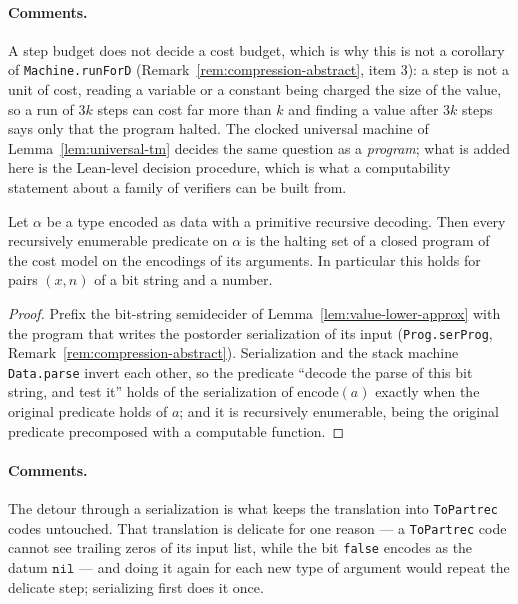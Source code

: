 \paragraph{Comments.} A step budget does not decide a cost budget, which is why this is not
a corollary of \texttt{Machine.runForD} (Remark~\ref{rem:compression-abstract}, item 3): a
step is not a unit of cost, reading a variable or a constant being charged the size of the
value, so a run of $3k$ steps can cost far more than $k$ and finding a value after $3k$
steps says only that the program halted. The clocked universal machine of
Lemma~\ref{lem:universal-tm} decides the same question as a \emph{program}; what is added
here is the Lean-level decision procedure, which is what a computability statement about a
family of verifiers can be built from.

\effortEasy

\begin{lemma}
\label{lem:semidecide-encoded}
\leanok
Let $\alpha$ be a type encoded as data with a primitive recursive decoding. Then every
recursively enumerable predicate on $\alpha$ is the halting set of a closed program of the
cost model on the encodings of its arguments. In particular this holds for pairs
$(x, n)$ of a bit string and a number.
\end{lemma}

\begin{proof}
\leanok
Prefix the bit-string semidecider of Lemma~\ref{lem:value-lower-approx} with the program
that writes the postorder serialization of its input (\texttt{Prog.serProg},
Remark~\ref{rem:compression-abstract}). Serialization and the stack machine
\texttt{Data.parse} invert each other, so the predicate ``decode the parse of this bit
string, and test it'' holds of the serialization of $\mathrm{encode}(a)$ exactly when the
original predicate holds of $a$; and it is recursively enumerable, being the original
predicate precomposed with a computable function.
\end{proof}

\paragraph{Comments.} The detour through a serialization is what keeps the translation into
\texttt{ToPartrec} codes untouched. That translation is delicate for one reason --- a
\texttt{ToPartrec} code cannot see trailing zeros of its input list, while the bit
\texttt{false} encodes as the datum $\mathtt{nil}$ --- and doing it again for each new type
of argument would repeat the delicate step; serializing first does it once.

\effortEasy
